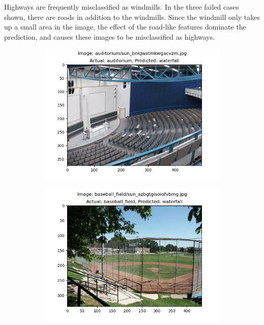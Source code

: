 \documentclass{article} %
\begin{document}
    Highways are frequently misclassified as windmills. In the three failed cases shown, there are roads in addition to the windmills. Since the windmill only takes up a small area in the image, the effect of the road-like features dominate the prediction, and causes these images to be misclassified as highways.

    \begin{figure}[h]
        \begin{subfigure}[b]{0.333\textwidth}
            \includegraphics[width=\textwidth]{q2,6_case_10.png}
        \end{subfigure}
        \begin{subfigure}[b]{0.333\textwidth}
            \includegraphics[width=\textwidth]{q2,6_case_22.png}

\end{subfigure}
\end{figure}
\end{document}
